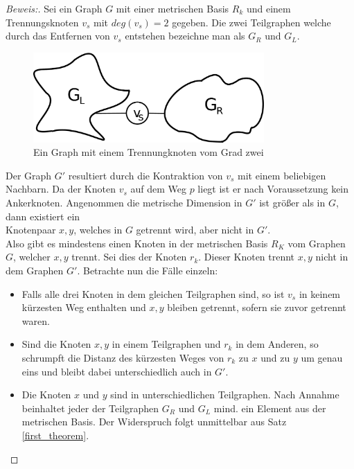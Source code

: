 \begin{proof}[Beweis:]
Sei ein Graph $G$ mit einer metrischen Basis $R_k$ und einem Trennungsknoten $v_s$ mit $deg(v_s)=2$ gegeben. Die zwei Teilgraphen welche durch das Entfernen von $v_s$ entstehen bezeichne man als $G_R$ und $G_L$.
\begin{figure}[ht]
\centering
\includegraphics*[width = 250pt]{bilder/proof4,2.pdf}
\caption{Ein Graph mit einem Trennungknoten vom Grad zwei}
\end{figure}
\newline Der Graph $G'$ resultiert durch die Kontraktion von $v_s$ mit einem beliebigen Nachbarn. Da der Knoten $v_s$ auf dem Weg $p$ liegt ist er nach Voraussetzung kein Ankerknoten.\newline
Angenommen die metrische Dimension in $G'$ ist größer als in $G$, dann existiert ein\\Knotenpaar $x,y$, welches in $G$ getrennt wird, aber nicht in $G'$.\\Also gibt es mindestens einen Knoten in der metrischen Basis $R_K$ vom Graphen $G$, welcher $x,y$ trennt. Sei dies der Knoten $r_k$. Dieser Knoten trennt $x,y$ nicht in dem Graphen $G'$. 
Betrachte nun die Fälle einzeln:
\begin{itemize}
\item Falls alle drei Knoten in dem gleichen Teilgraphen sind, so ist $v_s$ in keinem kürzesten Weg enthalten und $x,y$ bleiben getrennt, sofern sie zuvor getrennt waren.
\item Sind die Knoten $x,y$ in einem Teilgraphen und $r_k$ in dem Anderen, so schrumpft die Distanz des kürzesten Weges von $r_k$ zu $x$ und zu $y$ um genau eins und bleibt dabei unterschiedlich auch in $G'$.
\item Die Knoten $x$ und $y$ sind in unterschiedlichen Teilgraphen. Nach Annahme beinhaltet jeder der Teilgraphen $G_R$ und $G_L$ mind. ein Element aus der metrischen Basis. Der Widerspruch folgt unmittelbar aus Satz \ref{first_theorem}.
\end{itemize}
\end{proof}
